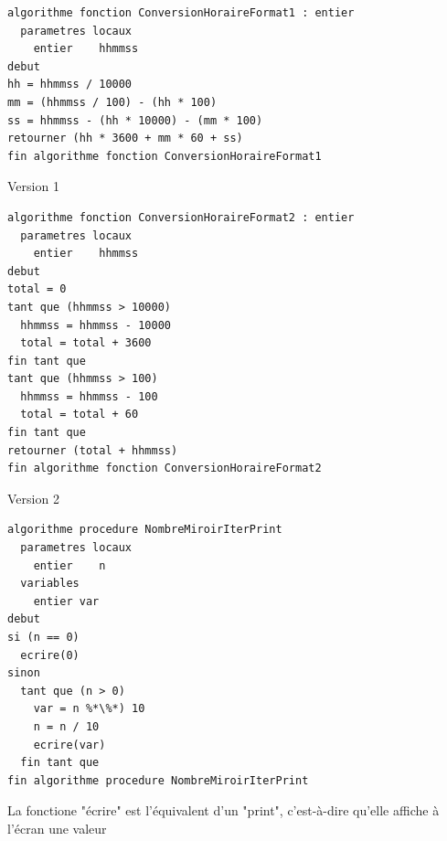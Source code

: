 \documentclass[11pt,a4paper]{article}
\begin{document}
\begin{table}[ht!]
  \centering
\begin{lstlisting}[style=algorithmique]
algorithme fonction ConversionHoraireFormat1 : entier
  parametres locaux
    entier    hhmmss
debut
hh = hhmmss / 10000
mm = (hhmmss / 100) - (hh * 100)
ss = hhmmss - (hh * 10000) - (mm * 100)
retourner (hh * 3600 + mm * 60 + ss)
fin algorithme fonction ConversionHoraireFormat1 \end{lstlisting}
  \caption{Version 1}
\end{table}


\begin{table}[ht!]
  \centering
\begin{lstlisting}[style=algorithmique]
algorithme fonction ConversionHoraireFormat2 : entier
  parametres locaux
    entier    hhmmss
debut
total = 0
tant que (hhmmss > 10000)
  hhmmss = hhmmss - 10000
  total = total + 3600
fin tant que
tant que (hhmmss > 100)
  hhmmss = hhmmss - 100
  total = total + 60
fin tant que
retourner (total + hhmmss)
fin algorithme fonction ConversionHoraireFormat2 \end{lstlisting}
  \caption{Version 2}
\end{table}


\bigskip

\newpage


\begin{table}[ht!]
  \centering
\begin{lstlisting}[style=algorithmique]
algorithme procedure NombreMiroirIterPrint
  parametres locaux
    entier    n
  variables
    entier var
debut
si (n == 0)
  ecrire(0)
sinon
  tant que (n > 0)
    var = n %*\%*) 10
    n = n / 10
    ecrire(var)
  fin tant que
fin algorithme procedure NombreMiroirIterPrint \end{lstlisting}
  \caption{La fonctione "écrire" est l'équivalent d'un "print", c'est-à-dire qu'elle affiche à l'écran une valeur}
\end{table}
\end{document}
